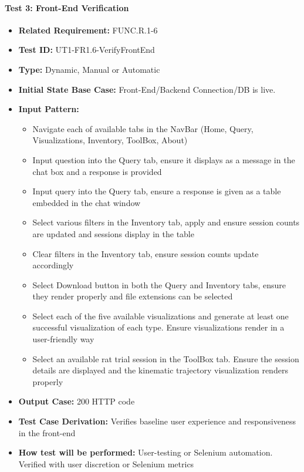 \documentclass[12pt, titlepage]{article}
\begin{document}
\begin{flushleft}
\paragraph{Test 3: Front-End Verification}
\begin{itemize}
    \item \textbf{Related Requirement:} FUNC.R.1-6
    \item \textbf{Test ID:} UT1-FR1.6-VerifyFrontEnd
    \item \textbf{Type:} Dynamic, Manual or Automatic
    \item \textbf{Initial State Base Case:} Front-End/Backend Connection/DB is live.
    \item \textbf{Input Pattern:}
      \begin{itemize}
        \item Navigate each of available tabs in the NavBar (Home, Query, Visualizations, Inventory, ToolBox, About)
        \item Input question into the Query tab, ensure it displays as a message in the chat box and a response is provided
        \item Input query into the Query tab, ensure a response is given as a table embedded in the chat window
        \item Select various filters in the Inventory tab, apply and ensure session counts are updated and sessions display in the table
        \item Clear filters in the Inventory tab, ensure session counts update accordingly
        \item Select Download button in both the Query and Inventory tabs, ensure they render properly and file extensions can be selected
        \item Select each of the five available visualizations and generate at least one successful visualization of each type. Ensure visualizations render in a user-friendly way
        \item Select an available rat trial session in the ToolBox tab. Ensure the session details are displayed and the kinematic trajectory visualization renders properly
      \end{itemize}
    \item \textbf{Output Case:} 200 HTTP code
    \item \textbf{Test Case Derivation:} Verifies baseline user experience and responsiveness in the front-end
    \item \textbf{How test will be performed:} User-testing or Selenium automation. Verified with user discretion or Selenium metrics
\end{itemize}


\end{flushleft}
\end{document}
